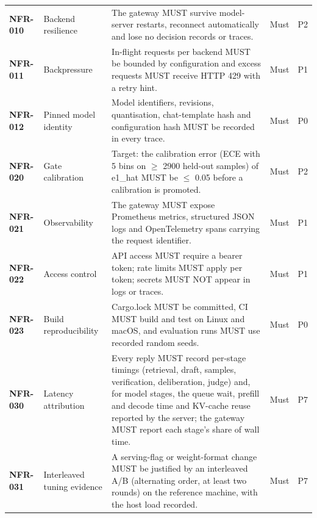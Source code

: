 \begin{longtable}{@{}p{1.45cm}p{2.5cm}p{8.1cm}p{1.6cm}p{1.1cm}@{}}
\textbf{NFR-010} & Backend resilience & The gateway MUST survive model-server restarts, reconnect automatically and lose no decision records or traces. & Must & P2\\
\textbf{NFR-011} & Backpressure & In-flight requests per backend MUST be bounded by configuration and excess requests MUST receive HTTP 429 with a retry hint. & Must & P1\\
\textbf{NFR-012} & Pinned model identity & Model identifiers, revisions, quantisation, chat-template hash and configuration hash MUST be recorded in every trace. & Must & P0\\
\textbf{NFR-020} & Gate calibration & Target: the calibration error (ECE with 5 bins on $\ge$ 2900 held-out samples) of e1\_hat MUST be $\le$ 0.05 before a calibration is promoted. & Must & P2\\
\textbf{NFR-021} & Observability & The gateway MUST expose Prometheus metrics, structured JSON logs and OpenTelemetry spans carrying the request identifier. & Must & P1\\
\textbf{NFR-022} & Access control & API access MUST require a bearer token; rate limits MUST apply per token; secrets MUST NOT appear in logs or traces. & Must & P1\\
\textbf{NFR-023} & Build reproducibility & Cargo.lock MUST be committed, CI MUST build and test on Linux and macOS, and evaluation runs MUST use recorded random seeds. & Must & P0\\
\textbf{NFR-030} & Latency attribution & Every reply MUST record per-stage timings (retrieval, draft, samples, verification, deliberation, judge) and, for model stages, the queue wait, prefill and decode time and KV-cache reuse reported by the server; the gateway MUST report each stage's share of wall time. & Must & P7\\
\textbf{NFR-031} & Interleaved tuning evidence & A serving-flag or weight-format change MUST be justified by an interleaved A/B (alternating order, at least two rounds) on the reference machine, with the host load recorded. & Must & P7\\
\end{longtable}


